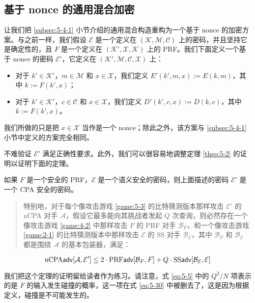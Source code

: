 \subsection{基于 nonce 的通用混合加密}\label{subsec:5-5-1}

让我们把 \ref{subsec:5-4-1} 小节介绍的通用混合构造重构为一个基于 nonce 的加密方案。与之前一样，我们假设 $\mathcal{E}$ 是一个定义在 $(\mathcal{K},\mathcal{M},\mathcal{C})$ 上的密码，并且坚持它是确定性的，且 $F$ 是一个定义在 $(\mathcal{K}',\mathcal{X},\mathcal{K})$ 上的 PRF。我们下面定义一个基于 nonce 的密码 $\mathcal{E}'$，它定义在 $(\mathcal{K}',\mathcal{M},\mathcal{C},\mathcal{X})$ 上：
\begin{itemize}
	\item 对于 $k'\in\mathcal{K}'$，$m\in\mathcal{M}$ 和 $x\in\mathcal{X}$，我们定义 $E'(k',m,x):=E(k,m)$，其中 $k:=F(k',x)$；
	\item 对于 $k'\in\mathcal{K}'$，$c\in\mathcal{C}$ 和 $x\in\mathcal{X}$，我们定义 $D'(k',c,x):=D(k,c)$，其中 $k:=F(k',x)$。
\end{itemize}
我们所做的只是把 $x\in\mathcal{X}$ 当作是一个 nonce；除此之外，该方案与 \ref{subsec:5-4-1} 小节中定义的方案完全相同。

不难验证 $\mathcal{E}'$ 满足正确性要求。此外，我们可以很容易地调整定理 \ref{theo:5-2} 的证明以证明下面的定理。

\begin{theorem}\label{theo:5-5}
如果 $F$ 是一个安全的 PRF，$\mathcal{E}$ 是一个语义安全的密码，则上面描述的密码 $\mathcal{E}'$ 是一个 CPA 安全的密码。
\begin{quote}
特别地，对于每个像攻击游戏 \ref{game:5-3} 的比特猜测版本那样攻击 $\mathcal{E}'$ 的 nCPA 对手 $\mathcal{A}$，假设它最多能向其挑战者发起 $Q$ 次查询，则必然存在一个像攻击游戏 \ref{game:4-2} 中那样攻击 $F$ 的 PRF 对手 $\mathcal{B}_F$，和一个像攻击游戏 \ref{game:2-1} 的比特猜测版本中那样攻击 $\mathcal{E}$ 的 SS 对手 $\mathcal{B}_\mathcal{E}$，其中 $\mathcal{B}_F$ 和 $\mathcal{B}_\mathcal{E}$ 都是围绕 $\mathcal{A}$ 的基本包装器，满足：
\end{quote}
\begin{equation}\label{eq:5-31}
{\rm nCPA}\mathsf{adv}[\mathcal{A},\mathcal{E}']\leq
2\cdot{\rm PRF}\mathsf{adv}[\mathcal{B}_F,F]+Q\cdot{\rm SS}\mathsf{adv}[\mathcal{B}_\mathcal{E},\mathcal{E}]
\end{equation}
\end{theorem}

我们把这个定理的证明留给读者作为练习。请注意，式 \ref{eq:5-5} 中的 ${Q^2}/{N}$ 项表示的是 $F$ 的输入发生碰撞的概率，这一项在式 \ref{eq:5-30} 中被删去了，这是因为根据定义，碰撞是不可能发生的。

